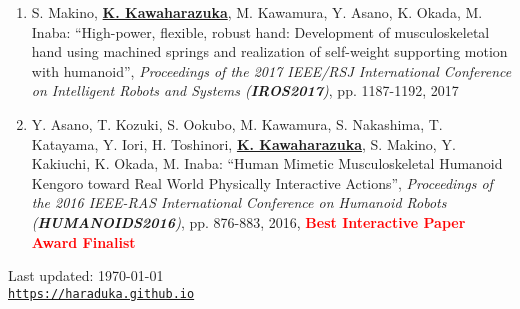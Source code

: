 \documentclass[letterpaper]{article}
\def\footerlink{https://haraduka.github.io}
\begin{document}
\begin{enumerate}
\item S. Makino, \underline{\textbf{K. Kawaharazuka}}, M. Kawamura, Y. Asano, K. Okada, M. Inaba: ``High-power, flexible, robust hand: Development of musculoskeletal hand using machined springs and realization of self-weight supporting motion with humanoid'', \textit{Proceedings of the 2017 IEEE/RSJ International Conference on Intelligent Robots and Systems (\textit{\textbf{IROS2017}})}, pp. 1187-1192, 2017
\item Y. Asano, T. Kozuki, S. Ookubo, M. Kawamura, S. Nakashima, T. Katayama, Y. Iori, H. Toshinori, \underline{\textbf{K. Kawaharazuka}}, S. Makino, Y. Kakiuchi, K. Okada, M. Inaba: ``Human Mimetic Musculoskeletal Humanoid Kengoro toward Real World Physically Interactive Actions'', \textit{Proceedings of the 2016 IEEE-RAS International Conference on Humanoid Robots (\textit{\textbf{HUMANOIDS2016}})}, pp. 876-883, 2016, \textbf{\textcolor{red}{Best Interactive Paper Award Finalist}}
\end{enumerate}


\bigskip

\begin{center}
  \begin{footnotesize}
    Last updated: \today \\
    \href{\footerlink}{\texttt{\footerlink}}
  \end{footnotesize}
\end{center}
\end{document}
